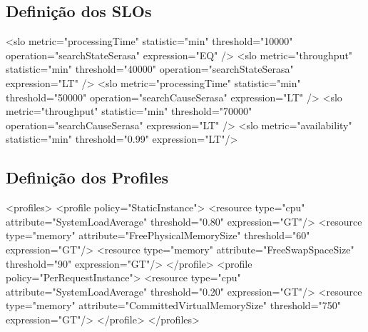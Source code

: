 \subsection{Definição dos SLOs}
\small
\begin{verbatimtab}[4]
<slo metric="processingTime" statistic="min" threshold="10000"  
	operation="searchStateSerasa" expression="EQ" />
<slo metric="throughput"     statistic="min" threshold="40000"  
	operation="searchStateSerasa" expression="LT" />
<slo metric="processingTime" statistic="min" threshold="50000"  
	operation="searchCauseSerasa" expression="LT" />
<slo metric="throughput"     statistic="min" threshold="70000" 
	operation="searchCauseSerasa" expression="LT" />
<slo metric="availability"   statistic="min" threshold="0.99"   
	expression="LT"/>
\end{verbatimtab}


\subsection{Definição dos Profiles}
\small
\begin{verbatimtab}[4]
<profiles>
	<profile policy="StaticInstance">
		<resource type="cpu" 	attribute="SystemLoadAverage" 
			threshold="0.80" expression="GT"/>
		<resource type="memory" attribute="FreePhysicalMemorySize" 
			threshold="60" expression="GT"/>
		<resource type="memory" attribute="FreeSwapSpaceSize" 
			threshold="90" expression="GT"/>
	</profile>
	<profile policy="PerRequestInstance">
		<resource type="cpu" 	attribute="SystemLoadAverage" 
			threshold="0.20" expression="GT"/>
		<resource type="memory" attribute="CommittedVirtualMemorySize" 
			threshold="750" expression="GT"/>
	</profile>
</profiles>
\end{verbatimtab}
